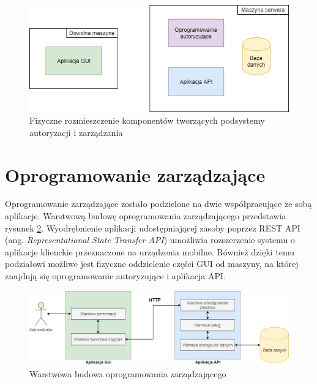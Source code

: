     	\begin{figure}[]
            \centering
            \includegraphics[width=\textwidth]{chapters/images/fiz.png}
            \caption{Fizyczne rozmieszczenie komponentów tworzących podsystemy autoryzacji i zarządzania}
            \label{fig:fiz}
        \end{figure}

    \section{Oprogramowanie zarządzające}

    	Oprogramowanie zarządzające zostało podzielone na dwie współpracujące ze sobą aplikacje. Warstwową budowę oprogramowania zarządzającego przedstawia rysunek \ref{fig:mngmt_subs_layers}. Wyodrębnienie aplikacji udostępniającej zasoby poprzez REST API (ang. \textit{Representational State Transfer API}) umożliwia rozszerzenie systemu o aplikacje klienckie przeznaczone na urządzenia mobilne. Również dzięki temu podziałowi możliwe jest fizyczne oddzielenie części GUI od maszyny, na której znajdują się oprogramowanie autoryzujące i aplikacja API.

        \begin{figure}[]
            \centering
            \includegraphics[width=\textwidth]{chapters/images/mngmt_subsystem_layers.png}
            \caption{Warstwowa budowa oprogramowania zarządzającego}
            \label{fig:mngmt_subs_layers}
        \end{figure}

